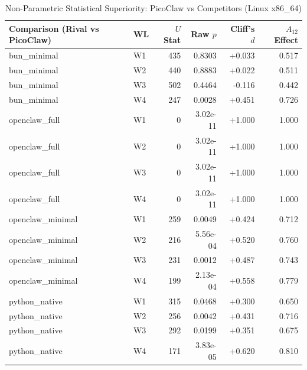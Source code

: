\begin{table}[t]
\centering\small
\caption{Non-Parametric Statistical Superiority: PicoClaw vs Competitors (Linux x86_64)}
\label{tab:linux_stat_tests}
\begin{tabular}{llrrrr}
\toprule
Comparison (Rival vs PicoClaw) & WL & $U$ Stat & Raw $p$ & Cliff's $d$ & $A_{12}$ Effect \\
\midrule
bun\_minimal & W1 & 435 & 0.8303 & +0.033 & 0.517 \\
bun\_minimal & W2 & 440 & 0.8883 & +0.022 & 0.511 \\
bun\_minimal & W3 & 502 & 0.4464 & -0.116 & 0.442 \\
bun\_minimal & W4 & 247 & 0.0028 & +0.451 & 0.726 \\
openclaw\_full & W1 & 0 & 3.02e-11 & +1.000 & 1.000 \\
openclaw\_full & W2 & 0 & 3.02e-11 & +1.000 & 1.000 \\
openclaw\_full & W3 & 0 & 3.02e-11 & +1.000 & 1.000 \\
openclaw\_full & W4 & 0 & 3.02e-11 & +1.000 & 1.000 \\
openclaw\_minimal & W1 & 259 & 0.0049 & +0.424 & 0.712 \\
openclaw\_minimal & W2 & 216 & 5.56e-04 & +0.520 & 0.760 \\
openclaw\_minimal & W3 & 231 & 0.0012 & +0.487 & 0.743 \\
openclaw\_minimal & W4 & 199 & 2.13e-04 & +0.558 & 0.779 \\
python\_native & W1 & 315 & 0.0468 & +0.300 & 0.650 \\
python\_native & W2 & 256 & 0.0042 & +0.431 & 0.716 \\
python\_native & W3 & 292 & 0.0199 & +0.351 & 0.675 \\
python\_native & W4 & 171 & 3.83e-05 & +0.620 & 0.810 \\
\bottomrule
\end{tabular}
\end{table}
